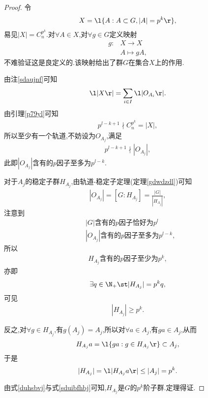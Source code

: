 \begin{proof}
    令\begin{align*}
        X=\l\{A:A\subset G,|A|=p^k\r\},
    \end{align*}易见$|X|=C_{n}^{p^k}$.对$\forall A\in X$,对$\forall g\in G$定义映射\begin{align*}
        g:&X\to X\\
        &A\mapsto gA,
    \end{align*}不难验证这是良定义的.该映射给出了群$G$在集合$X$上的作用.

    由注\ref{sdaujnf}可知\begin{align*}
        \l|X\r|=\sum_{i\in I}\l|O_{A_i}\r|.
    \end{align*}由引理\ref{p79yl}可知\begin{align*}
        p^{l-k+1}\nmid C_n^{p^k}=|X|,
    \end{align*}所以至少有一个轨道,不妨设为$O_{A_j}$,满足\begin{align*}
        p^{l-k+1}\nmid|O_{A_j}|,
    \end{align*}此即$|O_{A_j}|$含有的$p$因子至多为$p^{l-k}$.
    
    对于$A_j$的稳定子群$H_{A_j}$,由轨道-稳定子定理(定理\ref{gdwdzdl})可知\begin{align*}
        |O_{A_j}|=[G:H_{A_j}]=\frac{|G|}{|H_{A_j}|},
    \end{align*}注意到\begin{align*}
        &\text{$|G|$含有的$p$因子恰好为$p^l$}\\
        &\text{$|O_{A_j}|$含有的$p$因子至多为$p^{l-k}$},
    \end{align*}所以\begin{align*}
        \text{$H_{A_j}$含有的$p$因子至少为$p^k$},
    \end{align*}亦即\begin{align*}
        \exists q\in\N_+\st|H_{A_j}|=p^kq,
    \end{align*}可见\begin{align}\label{duhsbvj}
        |H_{A_j}|\geq p^k.
    \end{align}

    反之,对$\forall g\in H_{A_j}$,有$g(A_j)=A_j$,所以对$\forall a\in A_j$,有$ga\in A_j$,从而\begin{align*}
        H_{A_j}a=\l\{ga:g\in H_{A_j}\r\}\subset A_j,
    \end{align*}于是\begin{align}\label{sduibfhbj}
        |H_{A_j}|=\l|H_{A_j}a\r|\leq|A_j|=p^k.
    \end{align}

    由式\eqref{duhsbvj}与式\eqref{sduibfhbj}可知,$H_{A_j}$是$G$的$p^k$阶子群.定理得证.
\end{proof}
